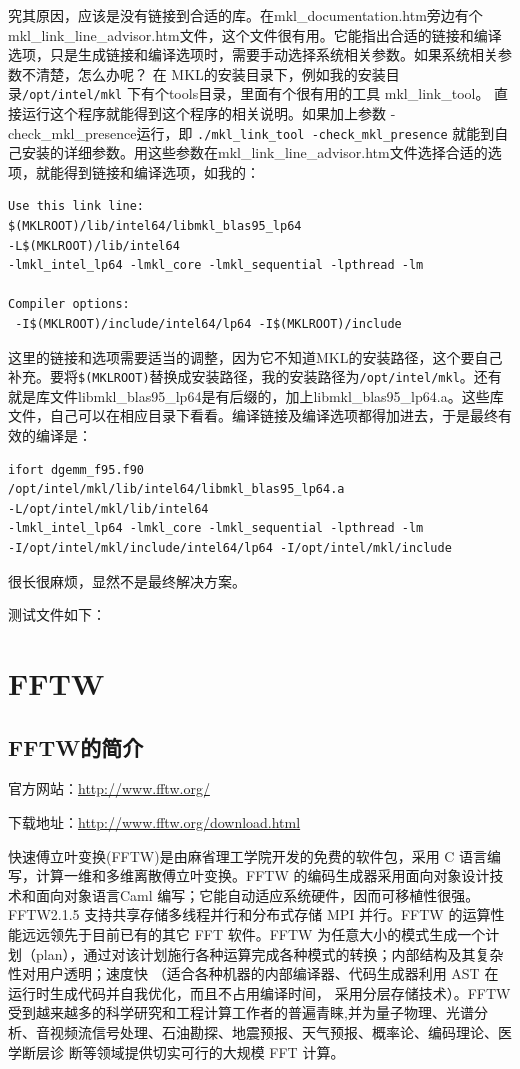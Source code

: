 究其原因，应该是没有链接到合适的库。在mkl\_documentation.htm旁边有个
mkl\_link\_line\_advisor.htm文件，这个文件很有用。它能指出合适的链接和编译选项，只是生成链接和编译选项时，需要手动选择系统相关参数。如果系统相关参数不清楚，怎么办呢？ 在 MKL的安装目录下，例如我的安装目录\verb|/opt/intel/mkl| 下有个tools目录，里面有个很有用的工具 mkl\_link\_tool。 直接运行这个程序就能得到这个程序的相关说明。如果加上参数 -check\_mkl\_presence运行，即 \verb|./mkl_link_tool -check_mkl_presence| 就能到自己安装的详细参数。用这些参数在mkl\_link\_line\_advisor.htm文件选择合适的选项，就能得到链接和编译选项，如我的：
\begin{verbatim}
Use this link line: 
$(MKLROOT)/lib/intel64/libmkl_blas95_lp64 
-L$(MKLROOT)/lib/intel64 
-lmkl_intel_lp64 -lmkl_core -lmkl_sequential -lpthread -lm

Compiler options: 
 -I$(MKLROOT)/include/intel64/lp64 -I$(MKLROOT)/include
\end{verbatim}
这里的链接和选项需要适当的调整，因为它不知道MKL的安装路径，这个要自己补充。要将\verb|$(MKLROOT)|替换成安装路径，我的安装路径为\verb|/opt/intel/mkl|。还有就是库文件libmkl\_blas95\_lp64是有后缀的，加上libmkl\_blas95\_lp64.a。这些库文件，自己可以在相应目录下看看。编译链接及编译选项都得加进去，于是最终有效的编译是：
\begin{verbatim}
ifort dgemm_f95.f90 
/opt/intel/mkl/lib/intel64/libmkl_blas95_lp64.a 
-L/opt/intel/mkl/lib/intel64 
-lmkl_intel_lp64 -lmkl_core -lmkl_sequential -lpthread -lm 
-I/opt/intel/mkl/include/intel64/lp64 -I/opt/intel/mkl/include
\end{verbatim}
很长很麻烦，显然不是最终解决方案。

测试文件如下：







\section{FFTW}
\subsection{FFTW的简介}
官方网站：\url{http://www.fftw.org/}

下载地址：\url{http://www.fftw.org/download.html}

快速傅立叶变换(FFTW)是由麻省理工学院开发的免费的软件包，采用 C 语言编写，计算一维和多维离散傅立叶变换。FFTW 的编码生成器采用面向对象设计技术和面向对象语言Caml 编写；它能自动适应系统硬件，因而可移植性很强。FFTW2.1.5 支持共享存储多线程并行和分布式存储 MPI 并行。FFTW 的运算性能远远领先于目前已有的其它 FFT 软件。FFTW 为任意大小的模式生成一个计划（plan），通过对该计划施行各种运算完成各种模式的转换；内部结构及其复杂性对用户透明；速度快 （适合各种机器的内部编译器、代码生成器利用 AST 在运行时生成代码并自我优化，而且不占用编译时间，
采用分层存储技术）。FFTW 受到越来越多的科学研究和工程计算工作者的普遍青睐,并为量子物理、光谱分析、音视频流信号处理、石油勘探、地震预报、天气预报、概率论、编码理论、医学断层诊
断等领域提供切实可行的大规模 FFT 计算。


